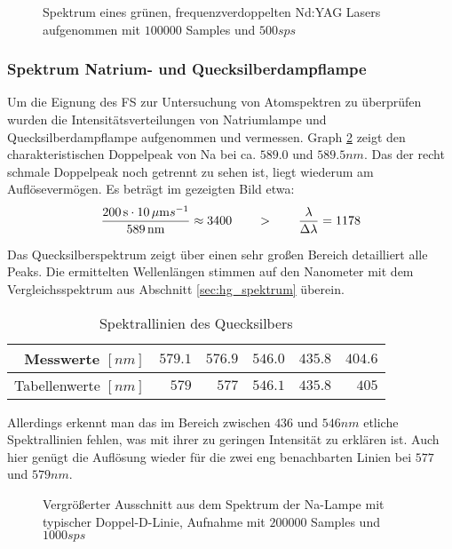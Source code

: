 			\begin{figure}[htb]
				\centering
				
				\caption{Spektrum eines grünen, frequenzverdoppelten Nd:YAG Lasers aufgenommen mit $100000$ Samples und $500 \unit{sps}$}
				\label{fig:nd-yaq-laser}
			\end{figure}


		\subsubsection{Spektrum Natrium- und Quecksilberdampflampe} %
		\label{ssub:spektrum_natrium_und_quecksilberdampflampe}

			Um die Eignung des FS zur Untersuchung von Atomspektren zu überprüfen wurden die Intensitätsverteilungen von Natriumlampe und Quecksilberdampflampe aufgenommen und vermessen.
			Graph \ref{fig:na-spec} zeigt den charakteristischen Doppelpeak von Na bei ca. $589.0$ und $589.5 \unit{nm}$.
			Das der recht schmale Doppelpeak noch getrennt zu sehen ist, liegt wiederum am Auflösevermögen.
			Es beträgt im gezeigten Bild etwa:
			\[ \frac{200 \, \mathrm{s} \cdot 10 \,\mu\mathrm{m}s^{-1}}{589 \, \mathrm{nm}} \approx 3400 \qquad > \qquad \frac{\lambda}{\Delta \lambda} = 1178 \]

			Das Quecksilberspektrum zeigt über einen sehr großen Bereich detailliert alle Peaks.
			Die ermittelten Wellenlängen stimmen auf den Nanometer mit dem Vergleichsspektrum aus Abschnitt \ref{sec:hg_spektrum} überein.
			\begin{table}[h]
				\begin{tabular}{r|rrrrr}
					Messwerte $[\unit{nm}]$ & $579.1$ & $576.9$ & $546.0$ & $435.8$ & $404.6$ \\
					\hline
					Tabellenwerte $[\unit{nm}]$ & $579$ & $577$ & $546.1$ & $435.8$ & $405$
				\end{tabular}
				\caption{Spektrallinien des Quecksilbers}
			\end{table}
			Allerdings erkennt man das im Bereich zwischen $436$ und $546 \unit{nm}$ etliche Spektrallinien fehlen, was mit ihrer zu geringen Intensität zu erklären ist.
			Auch hier genügt die Auflösung wieder für die zwei eng benachbarten Linien bei $577$ und $579 \unit{nm}$.


			\begin{figure}[htb]
				\centering
				
				\caption{Vergrößerter Ausschnitt aus dem Spektrum der Na-Lampe mit typischer Doppel-D-Linie,
				Aufnahme mit $200000$ Samples und $1000 \unit{sps}$}
				\label{fig:na-spec}
			\end{figure}

